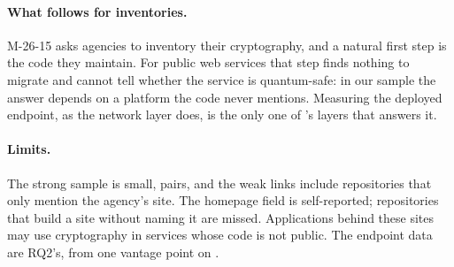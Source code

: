 \paragraph{What follows for inventories.} M-26-15 asks agencies to inventory
their cryptography, and a natural first step is the code they maintain. For
public web services that step finds nothing to migrate and cannot tell
whether the service is quantum-safe: in our sample the answer depends on a
platform the code never mentions. Measuring the deployed endpoint, as the
network layer does, is the only one of \tool{}'s layers that answers it.

\paragraph{Limits.} The strong sample is small,  pairs, and
the weak links include repositories that only mention the agency's site. The
homepage field is self-reported; repositories that build a site without naming
it are missed. Applications behind these sites may use cryptography in services
whose code is not public. The endpoint data are RQ2's, from one vantage point
on .

